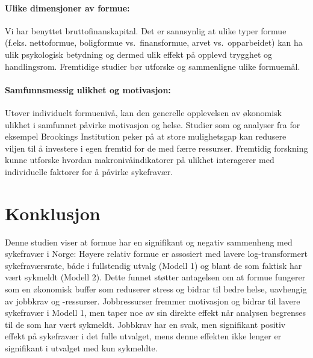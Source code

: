 \documentclass[
  12pt,
  a4paper,
  DIV=11,
  numbers=noendperiod]{scrartcl}
\let\oldparagraph\paragraph
\renewcommand{\paragraph}[1]{\oldparagraph{#1}\mbox{}}
\begin{document}
\paragraph{Ulike dimensjoner av
formue:}\label{ulike-dimensjoner-av-formue}

Vi har benyttet bruttofinanskapital. Det er sannsynlig at ulike typer
formue (f.eks. nettoformue, boligformue vs.~finansformue, arvet
vs.~opparbeidet) kan ha ulik psykologisk betydning og dermed ulik effekt
på opplevd trygghet og handlingsrom. Fremtidige studier bør utforske og
sammenligne ulike formuemål.

\paragraph{Samfunnsmessig ulikhet og
motivasjon:}\label{samfunnsmessig-ulikhet-og-motivasjon}

Utover individuelt formuenivå, kan den generelle opplevelsen av
økonomisk ulikhet i samfunnet påvirke motivasjon og helse. Studier som
\href{https://pmc.ncbi.nlm.nih.gov/articles/PMC7473543}{} og analyser
fra for eksempel Brookings Institution
\href{https://www.brookings.edu/articles/income-inequality-social-mobility-and-the-decision-to-drop-out-of-high-school/}{}
peker på at store mulighetsgap kan redusere viljen til å investere i
egen fremtid for de med færre ressurser. Fremtidig forskning kunne
utforske hvordan makronivåindikatorer på ulikhet interagerer med
individuelle faktorer for å påvirke sykefravær.

\newpage

\section{Konklusjon}\label{konklusjon}

Denne studien viser at formue har en signifikant og negativ sammenheng
med sykefravær i Norge: Høyere relativ formue er assosiert med lavere
log-transformert sykefraværsrate, både i fullstendig utvalg (Modell 1)
og blant de som faktisk har vært sykmeldt (Modell 2). Dette funnet
støtter antagelsen om at formue fungerer som en økonomisk buffer som
reduserer stress og bidrar til bedre helse, uavhengig av jobbkrav og
-ressurser. Jobbressurser fremmer motivasjon og bidrar til lavere
sykefravær i Modell 1, men taper noe av sin direkte effekt når analysen
begrenses til de som har vært sykmeldt. Jobbkrav har en svak, men
signifikant positiv effekt på sykefravær i det fulle utvalget, mens
denne effekten ikke lenger er signifikant i utvalget med kun sykmeldte.
\end{document}
